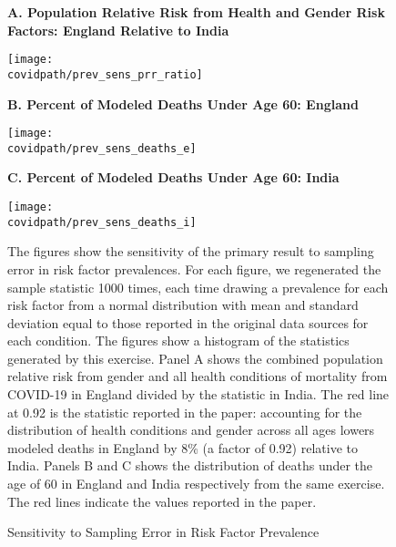 \documentclass[12pt,letterpaper]{article}
\numberwithin{equation}{section}
\begin{document}
  \begin{figure}[H]
    \begin{center}
      \caption{Sensitivity to Sampling Error in Risk Factor Prevalence}
      
      \footnotesize{\textbf{A. Population Relative Risk from Health and Gender Risk
        Factors: \newline England Relative to India}}
      
      \texttt{[image: \\covidpath/prev\_sens\_prr\_ratio]}

      \newline
      
      \footnotesize{\textbf{B. Percent of Modeled Deaths Under Age 60: England}}
      
      \texttt{[image: \\covidpath/prev\_sens\_deaths\_e]}

      \newline
      
      \footnotesize{\textbf{C. Percent of Modeled Deaths Under Age 60: India}}
      
      \texttt{[image: \\covidpath/prev\_sens\_deaths\_i]}
    
    \end{center}
    
    \footnotesize{The figures show the sensitivity of the primary
      result to sampling error in risk factor prevalences. For each
      figure, we regenerated the sample statistic 1000 times, each
      time drawing a prevalence for each risk factor from a normal
      distribution with mean and standard deviation equal to those reported
      in the original data sources for each condition. The
      figures show a histogram of the statistics generated by this
      exercise. Panel A shows the combined population relative risk
      from gender and all health conditions of mortality from COVID-19
      in England divided by the statistic in India. The red line at
      0.92 is the statistic reported in the paper: accounting for the
      distribution of health conditions and gender across all ages
      lowers modeled deaths in England by 8\% (a factor of 0.92)
      relative to India. Panels B and C shows the distribution of
      deaths under the age of 60 in England and India respectively
      from the same exercise. The red lines indicate the values
      reported in the paper.}
  \end{figure}
\end{document}

